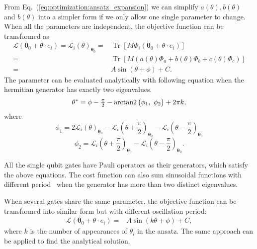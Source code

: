 From Eq.~(\ref{eq:optimization:ansatz_expansion}) we can simplify $a(\theta), b(\theta)$ and $b(\theta)$ into a simpler form if we only allow one single parameter to change. When all the parameters are independent, the objective function can be transformed as 
\begin{align}
\mathcal{L}(\boldsymbol{\theta}_0 {+} \theta \cdot e_i) = \mathcal{L}_i(\theta)_{\boldsymbol{\theta}_0} = & \operatorname{Tr}[M \Phi_i(\boldsymbol{\theta}_0 {+} \theta \cdot e_i)]\\
= & \operatorname{Tr}[M(a(\theta) \Phi_{a}
+ b(\theta) \Phi_{b}
+ c(\theta) \Phi_{c})]\\
= & A \sin(\theta + \phi) + C.
\end{align}
The parameter can be evaluated analytically with following equation when the hermitian generator has exactly two eigenvalues.
\begin{equation}
\begin{split}
    \theta^* = \phi - \tfrac{\pi}{2} - \operatorname{arctan2} \big( \phi_1 , ~ \phi_2\big) + 2\pi k,
\end{split}
\end{equation}
where 
\begin{equation}
    \phi_1 = 2\mathcal{L}_i(\theta)_{\boldsymbol{\theta}_0} - \mathcal{L}_i(\theta+\frac{\pi}{2})_{\boldsymbol{\theta}_0} - \mathcal{L}_i(\theta-\frac{\pi}{2})_{\boldsymbol{\theta}_0} 
\end{equation}
\begin{equation}
    \phi_2 =\mathcal{L}_i(\theta+\frac{\pi}{2})_{\boldsymbol{\theta}_0} - \mathcal{L}_i(\theta-\frac{\pi}{2})_{\boldsymbol{\theta}_0}.
\end{equation}

All the single qubit gates have Pauli operators as their generators, which satisfy the above equations. The cost function can also sum sinusoidal functions with different period~\cite{GeneralGradientsWierichs2022,Vidal2018CalculusQuantumCircuit} when the generator has more than two distinct eigenvalues.

When several gates share the same parameter, the objective function can be transformed into similar form but with different oscillation period:
\begin{align}
\mathcal{L}(\boldsymbol{\theta}_0 {+} \theta \cdot e_i)
= & A \sin( k \theta + \phi) + C,
\end{align}
where $k$ is the number of appearances of $\theta_i$ in the ansatz. The same approach can be applied to find the analytical solution.


